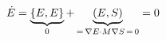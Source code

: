 \documentclass[preview]{standalone}
\begin{document}
\begin{align*}
\special{dvisvgm:raw <g id='unique000'>}\dot E=\underbrace{\{E,E\}}_{0}+\underbrace{(E,S)}_{=\,\nabla E\cdot M\nabla S\,=\,0}=0\special{dvisvgm:raw </g>}
\end{align*}
\end{document}
